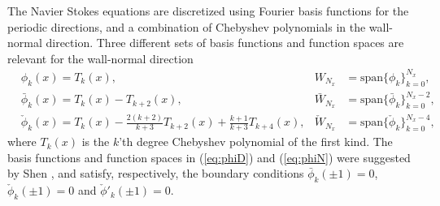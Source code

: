 \documentclass[preprint]{elsarticle}
\newcommand{\N}[1]{\check{#1}}
\newcommand{\D}[1]{\bar{#1}}
\begin{document}
The Navier Stokes equations are discretized using Fourier basis functions for the periodic directions, and a combination of Chebyshev polynomials in the wall-normal direction. Three different sets of basis functions and function spaces are relevant for the wall-normal direction
\begin{align}
&  \phi_k(x) = T_k(x), & W_{N_x} &= \text{span}\{\phi_k\}_{k=0}^{N_x}, \label{eq:Tk}\\
& \D{\phi}_k(x) = T_k(x) - T_{k+2}(x), & \D{W}_{N_x} &= \text{span} \{ \D{\phi}_k\}_{k=0}^{N_x-2}, \label{eq:phiD}\\
& \N{\phi}_k(x) = T_k(x) - \frac{2(k+2)}{k+3} T_{k+2}(x) + 
\frac{k+1}{k+3} T_{k+4}(x), & \N{W}_{N_x} &= \text{span} \{\N{\phi}_k\}_{k=0}^{N_x-4}, \label{eq:phiN} 
\end{align}
where $T_k(x)$ is the $k$'th degree Chebyshev polynomial of the first kind. The 
basis functions and function spaces in (\ref{eq:phiD}) and (\ref{eq:phiN}) were 
suggested by Shen \cite{Shen95}, and satisfy, respectively, the boundary conditions 
$\D{\phi}_k(\pm 1) = 0$, $\N{\phi}_k(\pm 1)=0$ and $\N{\phi}'_k(\pm 1)=0$. 
\end{document}

